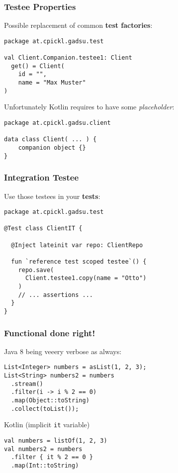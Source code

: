 
\begin{frame}[fragile] \frametitle{Testee Properties}
Possible replacement of common \textbf{test factories}:
\begin{lstlisting}
package at.cpickl.gadsu.test

val Client.Companion.testee1: Client
  get() = Client(
    id = "",
    name = "Max Muster"
)
\end{lstlisting}
\pause

Unfortunately Kotlin requires to have some \textit{placeholder}:
\begin{lstlisting}
package at.cpickl.gadsu.client

data class Client( ... ) {
    companion object {}
}
\end{lstlisting}
\end{frame}

\begin{frame}[fragile] \frametitle{Integration Testee}
Use those testees in your \textbf{tests}:
\begin{lstlisting}
package at.cpickl.gadsu.test

@Test class ClientIT {

  @Inject lateinit var repo: ClientRepo
  
  fun `reference test scoped testee`() {
    repo.save(
      Client.testee1.copy(name = "Otto")
    )
    // ... assertions ... 
  }
}
\end{lstlisting}
\end{frame}

\fulltitle{$\lambda$}

\begin{frame}[fragile] \frametitle{Functional done right!}
Java 8 being veeery verbose as always:
\begin{lstlisting}
List<Integer> numbers = asList(1, 2, 3);
List<String> numbers2 = numbers
  .stream()
  .filter(i -> i % 2 == 0)
  .map(Object::toString)
  .collect(toList());
\end{lstlisting}

Kotlin (implicit \texttt{it} variable)
\begin{lstlisting}
val numbers = listOf(1, 2, 3)
val numbers2 = numbers
  .filter { it % 2 == 0 }
  .map(Int::toString)
\end{lstlisting}
\end{frame}


